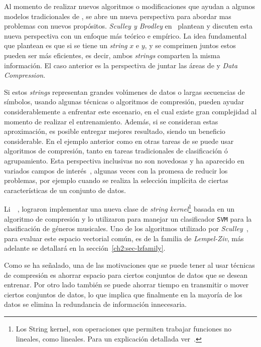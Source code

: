 Al momento de realizar nuevos algoritmos o modificaciones que ayudan a algunos modelos tradicionales de \machinelearning, se abre un nueva perspectiva para abordar mas problemas con nuevos propósitos. \emph{Sculley y Brodley} en~\cite{Sculley2006} plantean y discuten esta nueva perspectiva con un enfoque más teórico e empírico. La idea fundamental que plantean es que si se tiene un \emph{string} $x$ e $y$, y  se comprimen juntos estos pueden ser más eficientes, es decir,  ambos \emph{strings} comparten la misma información. El caso anterior es la perspectiva de juntar las áreas de \machinelearning y \emph{Data Compression}. 

Si estos \emph{strings} representan grandes volúmenes de datos o largas secuencias de símbolos, usando algunas técnicas o algoritmos de compresión, pueden ayudar considerablemente a enfrentar este escenario, en el cual existe gran complejidad al momento de realizar el entrenamiento. Además, si se consideran estas aproximación, es posible entregar mejores resultado, siendo un beneficio considerable. En el ejemplo anterior como en otras tareas de \machinelearning se puede usar algoritmos de compresión, tanto en tareas tradicionales de clasificación ó agrupamiento.  Esta perspectiva inclusivas no son novedosas y ha aparecido en variados campos de interés~\cite{Sculley2006}, algunas veces con la promesa de reducir los problemas, por ejemplo cuando se realiza la selección implícita de ciertas características de un conjunto de datos. 

Li~\etal~\cite{Li2005}, lograron implementar una nueva clase de \emph{string kernel}\footnote{Los String kernel, son operaciones que permiten trabajar funciones no lineales, como lineales. Para un explicación detallada ver~\cite{Li2005}.} basada en un algoritmo de compresión y lo utilizaron para manejar un clasificador \texttt{SVM} para la clasificación de géneros musicales. Uno de los algoritmos utilizado por \emph{Sculley}~\cite{Sculley2006}, para evaluar este espacio vectorial común, es de la familia de \emph{Lempel-Ziv}, más adelante se detallará en la  sección~\ref{ch2:sec-lzfamily}.

Como se ha señalado, una de las motivaciones que se puede tener al usar técnicas de compresión es ahorrar espacio para ciertos conjuntos de datos que se desean entrenar. Por otro lado también se puede ahorrar tiempo en transmitir o mover ciertos conjuntos de datos, lo que implica que finalmente en la mayoría de los datos se elimina la redundancia de información innecesaria.

